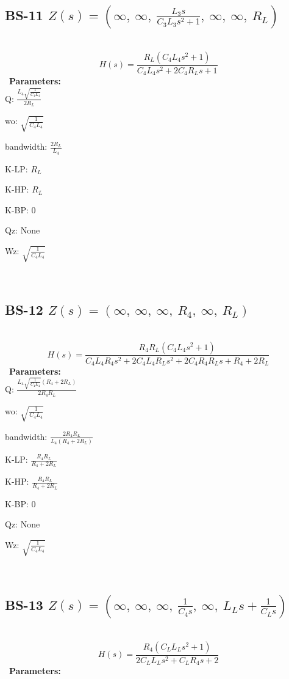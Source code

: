 \documentclass{article}
\begin{document}
\ 

\subsection{BS-11 $Z(s) = \left( \infty, \  \infty, \  \frac{L_{3} s}{C_{3} L_{3} s^{2} + 1}, \  \infty, \  \infty, \  R_{L}\right)$ } \ 
\textbf{\[H(s) = \frac{R_{L} \left(C_{4} L_{4} s^{2} + 1\right)}{C_{4} L_{4} s^{2} + 2 C_{4} R_{L} s + 1}\] } \ 
\textbf{Parameters:}\\ 

Q: $\frac{L_{4} \sqrt{\frac{1}{C_{4} L_{4}}}}{2 R_{L}}$\ 

wo: $\sqrt{\frac{1}{C_{4} L_{4}}}$\ 

bandwidth: $\frac{2 R_{L}}{L_{4}}$\ 

K-LP: $R_{L}$\ 

K-HP: $R_{L}$\ 

K-BP: $0$\ 

Qz: $\text{None}$\ 

Wz: $\sqrt{\frac{1}{C_{4} L_{4}}}$\ 

\ 

\subsection{BS-12 $Z(s) = \left( \infty, \  \infty, \  \infty, \  R_{4}, \  \infty, \  R_{L}\right)$ } \ 
\textbf{\[H(s) = \frac{R_{4} R_{L} \left(C_{4} L_{4} s^{2} + 1\right)}{C_{4} L_{4} R_{4} s^{2} + 2 C_{4} L_{4} R_{L} s^{2} + 2 C_{4} R_{4} R_{L} s + R_{4} + 2 R_{L}}\] } \ 
\textbf{Parameters:}\\ 

Q: $\frac{L_{4} \sqrt{\frac{1}{C_{4} L_{4}}} \left(R_{4} + 2 R_{L}\right)}{2 R_{4} R_{L}}$\ 

wo: $\sqrt{\frac{1}{C_{4} L_{4}}}$\ 

bandwidth: $\frac{2 R_{4} R_{L}}{L_{4} \left(R_{4} + 2 R_{L}\right)}$\ 

K-LP: $\frac{R_{4} R_{L}}{R_{4} + 2 R_{L}}$\ 

K-HP: $\frac{R_{4} R_{L}}{R_{4} + 2 R_{L}}$\ 

K-BP: $0$\ 

Qz: $\text{None}$\ 

Wz: $\sqrt{\frac{1}{C_{4} L_{4}}}$\ 

\ 

\subsection{BS-13 $Z(s) = \left( \infty, \  \infty, \  \infty, \  \frac{1}{C_{4} s}, \  \infty, \  L_{L} s + \frac{1}{C_{L} s}\right)$ } \ 
\textbf{\[H(s) = \frac{R_{4} \left(C_{L} L_{L} s^{2} + 1\right)}{2 C_{L} L_{L} s^{2} + C_{L} R_{4} s + 2}\] } \ 
\textbf{Parameters:}\\ 
\end{document}
